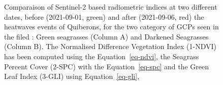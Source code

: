 \documentclass[
  number]{elsarticle}
\begin{document}
\label{cell-fig-NDVI_GLI_SPC}
\begin{figure}[H]


\caption{\label{fig-NDVI_GLI_SPC}Comparaison of Sentinel-2 based
radiometric indices at two different dates, before (2021-09-01, green)
and after (2021-09-06, red) the heatwaves events of Quiberons, for the
two category of GCPs seen in the filed : Green seagrasses (Column A) and
Darkened Seagrasses (Column B). The Normalised Difference Vegetation
Index (1-NDVI) has been computed using the Equation~\ref{eq-ndvi}, the
Seagrass Percent Cover (2-SPC) with the Equation~\ref{eq-spc} and the
Green Leaf Index (3-GLI) using Equation~\ref{eq-gli},}

\end{figure}%


\renewcommand\refname{Bibliography}
  
\end{document}
